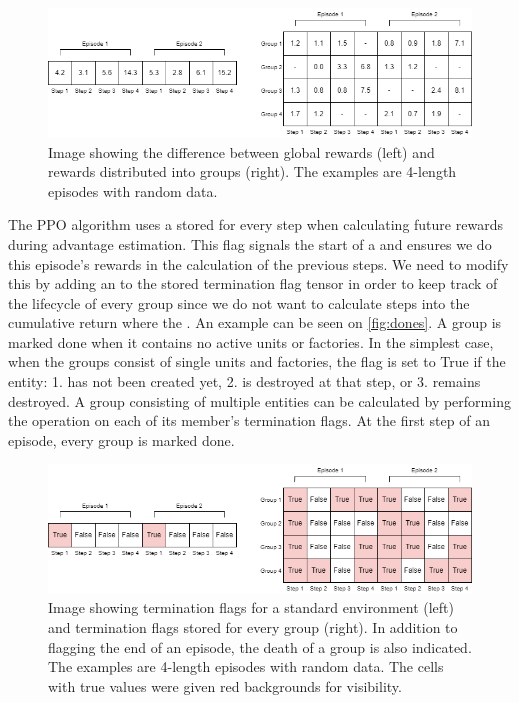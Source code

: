 \begin{figure}[htbp]
    \centering
    \includegraphics[width=0.8\linewidth]{images/methods_hybrid/trajectory_separation/rewards.png}
    \captionsetup{justification=justified, singlelinecheck=false, width=1\linewidth, labelfont=bf} 
    \caption[]{Image showing the difference between global rewards (left) and rewards distributed into groups (right). The examples are 4-length episodes with random data.}
    \label{fig:rewards}
\end{figure}

\bigskip

\noindent The PPO algorithm uses a  stored for every step when calculating future rewards during advantage estimation. This flag signals the start of a  and ensures we do  this episode's rewards in the  calculation of the previous steps. We need to modify this by adding an  to the stored termination flag tensor in order to keep track of the lifecycle of every group since we do not want to calculate steps into the cumulative return where the . An example can be seen on \autoref{fig:dones}. A group is marked done when it contains no active units or factories. In the simplest case, when the groups consist of single units and factories, the flag is set to True if the entity: 1. has not been created yet, 2. is destroyed at that step, or 3. remains destroyed. A group consisting of multiple entities can be calculated by performing the  operation on each of its member's termination flags. At the first step of an episode, every group is marked done.

\begin{figure}[htbp]
    \centering
    \includegraphics[width=0.8\linewidth]{images/methods_hybrid/trajectory_separation/dones.png}
    \captionsetup{justification=justified, singlelinecheck=false, width=1\linewidth, labelfont=bf} 
    \caption[]{Image showing termination flags for a standard environment (left) and termination flags stored for every group (right). In addition to flagging the end of an episode, the death of a group is also indicated. The examples are 4-length episodes with random data. The cells with true values were given red backgrounds for visibility.}
    \label{fig:dones}
\end{figure}


